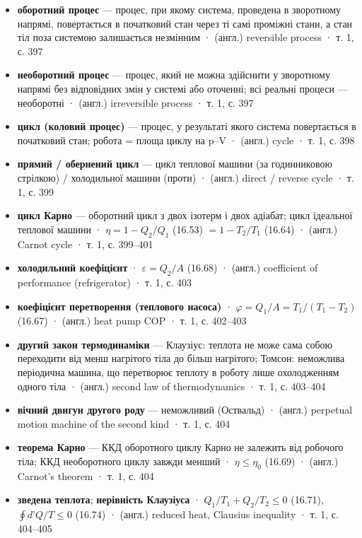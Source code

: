\documentclass[11pt,a4paper,oneside]{book}
\newcommand{\book}{}
\begin{document}
\begin{itemize}
\item \textbf{оборотний процес} — процес, при якому система, проведена в зворотному напрямі, повертається в початковий стан через ті самі проміжні стани, а стан тіл поза системою залишається незмінним · (англ.) reversible process · \book{} т. 1, с. 397
\item \textbf{необоротний процес} — процес, який не можна здійснити у зворотному напрямі без відповідних змін у системі або оточенні; всі реальні процеси — необоротні · (англ.) irreversible process · \book{} т. 1, с. 397
\item \textbf{цикл (коловий процес)} — процес, у результаті якого система повертається в початковий стан; робота = площа циклу на p–V · (англ.) cycle · \book{} т. 1, с. 398
\item \textbf{прямий / обернений цикл} — цикл теплової машини (за годинниковою стрілкою) / холодильної машини (проти) · (англ.) direct / reverse cycle · \book{} т. 1, с. 399
\item \textbf{цикл Карно} — оборотний цикл з двох ізотерм і двох адіабат; цикл ідеальної теплової машини · $\eta = 1 - Q_2/Q_1$ (16.53) $= 1 - T_2/T_1$ (16.64) · (англ.) Carnot cycle · \book{} т. 1, с. 399–401
\item \textbf{холодильний коефіцієнт} · $\varepsilon = Q_2/A$ (16.68) · (англ.) coefficient of performance (refrigerator) · \book{} т. 1, с. 403
\item \textbf{коефіцієнт перетворення (теплового насоса)} · $\varphi = Q_1/A = T_1/(T_1-T_2)$ (16.67) · (англ.) heat pump COP · \book{} т. 1, с. 402–403
\item \textbf{другий закон термодинаміки} — Клаузіус: теплота не може сама собою переходити від менш нагрітого тіла до більш нагрітого; Томсон: неможлива періодична машина, що перетворює теплоту в роботу лише охолодженням одного тіла · (англ.) second law of thermodynamics · \book{} т. 1, с. 403–404
\item \textbf{вічний двигун другого роду} — неможливий (Оствальд) · (англ.) perpetual motion machine of the second kind · \book{} т. 1, с. 404
\item \textbf{теорема Карно} — ККД оборотного циклу Карно не залежить від робочого тіла; ККД необоротного циклу завжди менший · $\eta \le \eta_0$ (16.69) · (англ.) Carnot's theorem · \book{} т. 1, с. 404
\item \textbf{зведена теплота}; \textbf{нерівність Клаузіуса} · $Q_1/T_1 + Q_2/T_2 \le 0$ (16.71), $\oint d\text{'}Q/T \le 0$ (16.74) · (англ.) reduced heat, Clausius inequality · \book{} т. 1, с. 404–405

\end{itemize}
\end{document}
